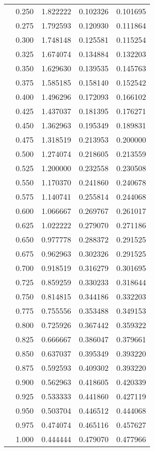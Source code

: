 \begin{tabular}{llrrr}
         & 0.250 &   1.822222 &   0.102326 &   0.101695 \\
         & 0.275 &   1.792593 &   0.120930 &   0.111864 \\
         & 0.300 &   1.748148 &   0.125581 &   0.115254 \\
         & 0.325 &   1.674074 &   0.134884 &   0.132203 \\
         & 0.350 &   1.629630 &   0.139535 &   0.145763 \\
         & 0.375 &   1.585185 &   0.158140 &   0.152542 \\
         & 0.400 &   1.496296 &   0.172093 &   0.166102 \\
         & 0.425 &   1.437037 &   0.181395 &   0.176271 \\
         & 0.450 &   1.362963 &   0.195349 &   0.189831 \\
         & 0.475 &   1.318519 &   0.213953 &   0.200000 \\
         & 0.500 &   1.274074 &   0.218605 &   0.213559 \\
         & 0.525 &   1.200000 &   0.232558 &   0.230508 \\
         & 0.550 &   1.170370 &   0.241860 &   0.240678 \\
         & 0.575 &   1.140741 &   0.255814 &   0.244068 \\
         & 0.600 &   1.066667 &   0.269767 &   0.261017 \\
         & 0.625 &   1.022222 &   0.279070 &   0.271186 \\
         & 0.650 &   0.977778 &   0.288372 &   0.291525 \\
         & 0.675 &   0.962963 &   0.302326 &   0.291525 \\
         & 0.700 &   0.918519 &   0.316279 &   0.301695 \\
         & 0.725 &   0.859259 &   0.330233 &   0.318644 \\
         & 0.750 &   0.814815 &   0.344186 &   0.332203 \\
         & 0.775 &   0.755556 &   0.353488 &   0.349153 \\
         & 0.800 &   0.725926 &   0.367442 &   0.359322 \\
         & 0.825 &   0.666667 &   0.386047 &   0.379661 \\
         & 0.850 &   0.637037 &   0.395349 &   0.393220 \\
         & 0.875 &   0.592593 &   0.409302 &   0.393220 \\
         & 0.900 &   0.562963 &   0.418605 &   0.420339 \\
         & 0.925 &   0.533333 &   0.441860 &   0.427119 \\
         & 0.950 &   0.503704 &   0.446512 &   0.444068 \\
         & 0.975 &   0.474074 &   0.465116 &   0.457627 \\
         & 1.000 &   0.444444 &   0.479070 &   0.477966 \\
\bottomrule
\end{tabular}
